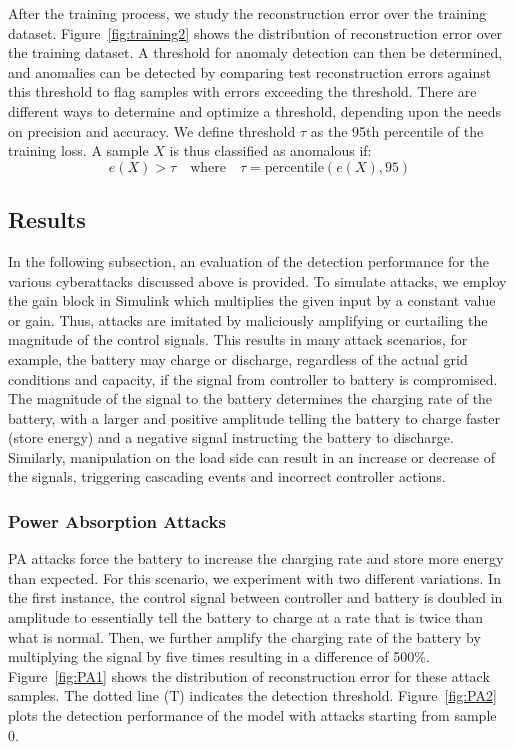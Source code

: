 After the training process, we study the reconstruction error over the training dataset. Figure~\ref{fig:training2} shows the distribution of reconstruction error over the training dataset. A threshold for anomaly detection can then be determined, and anomalies can be detected by comparing test reconstruction errors against this threshold to flag samples with errors exceeding the threshold. There are different ways to determine and optimize a threshold, depending upon the needs on precision and accuracy. We define threshold $\tau$ as the 95th percentile of the training loss. A sample $X$ is thus classified as anomalous if: \[ e(X) > \tau \quad \text{where} \quad \tau = \text{percentile}(e(X), 95) 
\]

\subsection{Results}
\label{results}

In the following subsection, an evaluation of the detection performance for the various cyberattacks discussed above is provided. To simulate attacks, we employ the gain block in Simulink which multiplies the given input by a constant value or gain. Thus, attacks are imitated by maliciously amplifying or curtailing the magnitude of the control signals. This results in many attack scenarios, for example, the battery may charge or discharge, regardless of the actual grid conditions and capacity, if the signal from controller to battery is compromised. The magnitude of the signal to the battery determines the charging rate of the battery, with a larger and positive amplitude telling the battery to charge faster (store energy) and a negative signal instructing the battery to discharge. Similarly, manipulation on the load side can result in an increase or decrease of the signals, triggering cascading events and incorrect controller actions. 

\subsubsection{Power Absorption Attacks}

PA attacks force the battery to increase the charging rate and store more energy than expected. For this scenario, we experiment with two different variations. In the first instance, the control signal between controller and battery is doubled in amplitude to essentially tell the battery to charge at a rate that is twice than what is normal. Then, we further amplify the charging rate of the battery by multiplying the signal by five times resulting in a difference of 500\%. Figure~\ref{fig:PA1} shows the distribution of reconstruction error for these attack samples. The dotted line (T) indicates the detection threshold. Figure~\ref{fig:PA2} plots the detection performance of the model with attacks starting from sample 0.%


